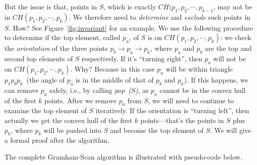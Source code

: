 But the issue is that, points in $S$, which is exactly $CH(p_1, p_2, \cdots, p_{k-1}$, may not be in
$CH(p_1, p_2, \cdots, p_k)$.  We therefore need to \emph{determine} and \emph{exclude} such points in $S$.
How? See Figure~\ref{fig:invariant} for an example.
We use the following procedure to determine if the top element, called $p_a$, of $S$ is on 
$CH(p_1, p_2, \cdots, p_k)$: we check the \emph{orientation} of the three points $p_b \to p_a \to p_k$,
where $p_a$ and $p_b$ are the top and second top elements of $S$ respectively.
If it's ``turning right'', then $p_a$ will not be on $CH(p_1, p_2, \cdots, p_k)$.
Why? Because in this case $p_a$ will be within triangle $p_1p_bp_k$~(the angle of $p_a$ is in the middle of that of $p_b$ and $p_k$).
If this happens, we can remove $p_a$ safely, i.e., by calling \emph{pop~($S$)}, as $p_a$ cannot be in the convex hull of the first $k$ points.
After we remove $p_a$ from $S$, we will need to continue to examine the top element of $S$ iteratively.
If the orientation is ``turning left'', then actually we get the convex hull of the first $k$ points---that's the points in $S$ plus $p_k$, where $p_k$ will be 
pushed into $S$ and become the top element of $S$. We will give a formal proof after the algorithm.



The complete Gramham-Scan algorithm is illustrated with pseudo-code below.

\begin{algorithmblock}[0.8\textwidth]
	\xxx
	\xxx
	\xxx
	\xxx
	\xxx
\end{algorithmblock}

\begin{algorithmblock}[0.8\textwidth]
	\xxx
	\xxx
	\xxx
	\xxx
	\xxx
	\xxx
	\xxx
	\xxx
	\xxx
	\xxx
	\xxx
	\xxx
\end{algorithmblock}

